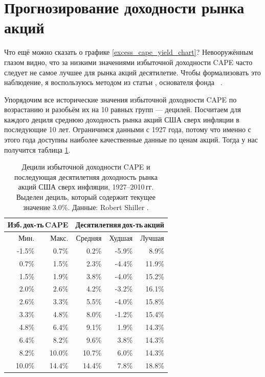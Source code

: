 \section*{Прогнозирование доходности рынка акций}

Что ещё можно сказать о графике \ref{excess_cape_yield_chart}? Невооружённым 
глазом видно, что за низкими значениями избыточной доходности CAPE часто 
следует не самое лучшее для рынка акций десятилетие. Чтобы формализовать это 
наблюдение, я воспользуюсь методом из статьи , основателя фонда \ \cite{asness2012old}.

Упорядочим все исторические значения избыточной доходности CAPE по возрастанию 
и разобьём их на 10 равных групп --- децилей. Посчитаем для каждого дециля 
среднюю доходность рынка акций США сверх инфляции в последующие 10 лет. 
Ограничимся данными с 1927 года, потому что именно с этого года доступны 
наиболее качественные данные по ценам акций. Тогда у нас получится таблица 
\ref{cape_excess_yield_and_stock_returns_table}.

\begin{table}[h]
\centering
\begin{tabular}{r|r|r|r|r}
\multicolumn{2}{c|}{Изб.\,дох-ть\,CAPE} &
\multicolumn{3}{c}{Десятилетняя\,дох-ть\,акций} \\
\hline
Мин. & Макс. & Средняя & Худшая & Лучшая \\
\hline
-1.5\% &  0.7\% &  0.2\%  & -5.9\% &  8.9\% \\
 0.7\% &  1.5\% &  2.3\%  & -4.4\% & 11.9\% \\
 1.5\% &  1.9\% &  3.8\%  & -4.0\% & 15.2\% \\
 2.0\% &  2.6\% &  4.2\%  & -3.2\% & 16.1\% \\ 
\hline
 2.6\% &  3.3\% &  5.5\%  & -4.0\% & 15.8\% \\
\hline
 3.3\% &  4.8\% &  8.0\%  & -1.2\% & 15.4\% \\
 4.8\% &  6.4\% &  9.1\%  &  1.9\% & 14.3\% \\
 6.4\% &  8.2\% &  9.6\%  &  3.8\% & 14.3\% \\
 8.2\% & 10.0\% &  10.7\% &  6.0\% & 14.3\% \\ 
10.0\% & 14.4\% &  14.4\% &  7.8\% & 18.8\%  
\end{tabular}
\caption{Децили избыточной доходности CAPE и последующая десятилетняя 
доходность рынка акций США сверх инфляции, 1927--2010\,гг. Выделен дециль, 
который содержит текущее значение 3.0\%. Данные: Robert Shiller 
\cite{shillerOnline}.}
\label{cape_excess_yield_and_stock_returns_table}
\end{table}


